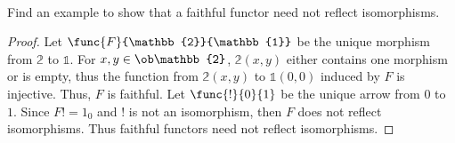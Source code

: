 \documentclass[../../main]{subfiles}
\begin{document}
\paragraph{}
\begin{exercise}
	Find an example to show that a faithful functor need not reflect
	isomorphisms.
\end{exercise}

\begin{proof}
	Let $\func{F}{\mathbb{2}}{\mathbb{1}}$ be the unique morphism from
	$\mathbb{2}$ to $\mathbb{1}$. For $x,y \in \ob\mathbb{2}$, $\mathbb{2}(x,y)$
	either contains one morphism or is empty, thus the  function from
	$\mathbb{2}(x,y)$ to $\mathbb{1}(0,0)$ induced by $F$ is injective. Thus,
	$F$ is faithful.  Let $\func{!}{0}{1}$ be the unique arrow from $0$ to $1$.
	Since $F! = 1_{0}$ and $!$ is not an isomorphism, then $F$ does not reflect
	isomorphisms. Thus faithful functors need not reflect isomorphisms.
\end{proof}
\end{document}
